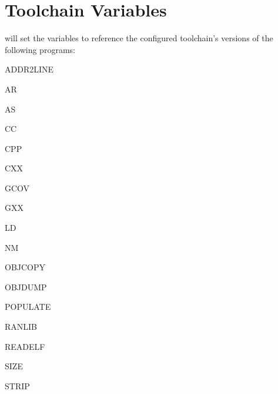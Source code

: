 \section{Toolchain Variables}

\lmsbw will set the \makefile variables to reference the configured
toolchain's versions of the following programs:

\begin{description}
\item{ADDR2LINE}
\item{AR}
\item{AS}
\item{CC}
\item{CPP}
\item{CXX}
\item{GCOV}
\item{GXX}
\item{LD}
\item{NM}
\item{OBJCOPY}
\item{OBJDUMP}
\item{POPULATE}
\item{RANLIB}
\item{READELF}
\item{SIZE}
\item{STRIP}
\end{description}
